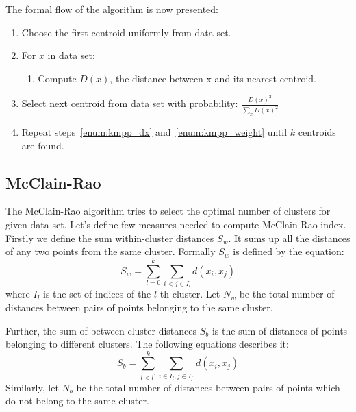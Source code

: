 \documentclass{mini}
\begin{document}
The formal flow of the algorithm is now presented:

\begin{enumerate}
    \item 
    Choose the first centroid uniformly from data set.
    \item \label{enum:kmpp_dx}
    For $x$ in data set:
    \begin{enumerate}
        \item
        Compute $D(x)$, the distance between x and its nearest centroid.
    \end{enumerate}
    
    \item \label{enum:kmpp_weight}
    Select next centroid from data set with probability:
    $\frac{D(x)^2}{\sum_{x}D(x)^2}$
    \item 
    Repeat steps~\ref{enum:kmpp_dx} and~\ref{enum:kmpp_weight} until $k$ centroids are found.
\end{enumerate}

\subsection{McClain-Rao}
The McClain-Rao algorithm tries to select the optimal number of clusters for given data set. Let's define few measures needed to compute McClain-Rao index. Firstly we define the sum within-cluster distances $S_w$. It sums up all the distances of any two points from the same cluster. Formally $S_w$ is defined by the equation: 
\begin{equation}
    S_w = \sum_{l=0}^{k} \sum_{i < j \in I_l} d(x_i, x_j)
\end{equation}
where $I_l$ is the set of indices of the $l$-th cluster. Let $N_w$ be the total number of distances between pairs of points belonging to the same cluster.

Further, the sum of between-cluster distances $S_b$ is the sum of distances of points belonging to different clusters. The following equations describes it:
\begin{equation}
    S_b = \sum_{l < l^{'}}^{k} \sum_{i \in I_{l}, j \in I_{l^{'}}}  d(x_i, x_j)
\end{equation}
Similarly, let $N_b$ be the total number of distances between pairs of points which do not belong to the same cluster.
\end{document}
